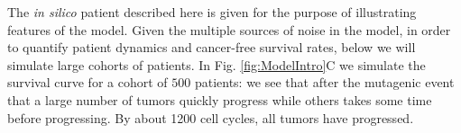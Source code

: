 \documentclass[11pt]{article}
\begin{document}
\par 
The {\em in silico} patient described here is given for the purpose of illustrating features of the model. Given the multiple sources of noise in the model, in order to quantify patient dynamics and cancer-free survival rates, below we will simulate large cohorts of patients. In Fig. \ref{fig:ModelIntro}C we simulate the survival curve for a cohort of $500$ patients: 
we see that after the mutagenic event that a large number of tumors quickly progress while others takes some time before progressing. By about 1200 cell cycles, all tumors have progressed.
\end{document}

